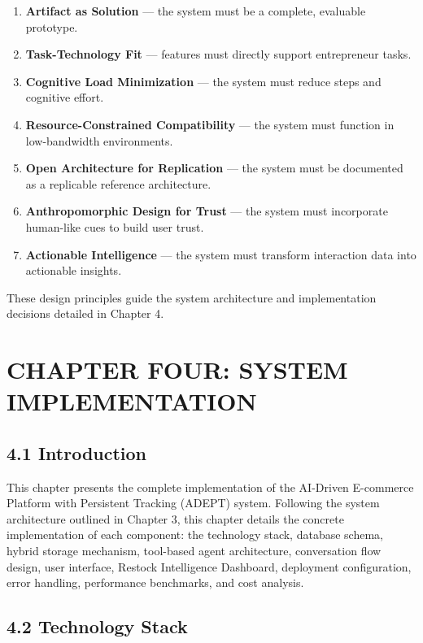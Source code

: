 \documentclass[12pt,a4paper]{article}
\begin{document}
\begin{enumerate}
    \item \textbf{Artifact as Solution} --- the system must be a complete, evaluable prototype.
    \item \textbf{Task-Technology Fit} --- features must directly support entrepreneur tasks.
    \item \textbf{Cognitive Load Minimization} --- the system must reduce steps and cognitive effort.
    \item \textbf{Resource-Constrained Compatibility} --- the system must function in low-bandwidth environments.
    \item \textbf{Open Architecture for Replication} --- the system must be documented as a replicable reference architecture.
    \item \textbf{Anthropomorphic Design for Trust} --- the system must incorporate human-like cues to build user trust.
    \item \textbf{Actionable Intelligence} --- the system must transform interaction data into actionable insights.
\end{enumerate}

These design principles guide the system architecture and implementation decisions detailed in Chapter 4.

\newpage

\section{CHAPTER FOUR: SYSTEM IMPLEMENTATION}

\subsection{4.1 Introduction}

This chapter presents the complete implementation of the AI-Driven E-commerce Platform with Persistent Tracking (ADEPT) system. Following the system architecture outlined in Chapter 3, this chapter details the concrete implementation of each component: the technology stack, database schema, hybrid storage mechanism, tool-based agent architecture, conversation flow design, user interface, Restock Intelligence Dashboard, deployment configuration, error handling, performance benchmarks, and cost analysis.

\subsection{4.2 Technology Stack}
\end{document}
